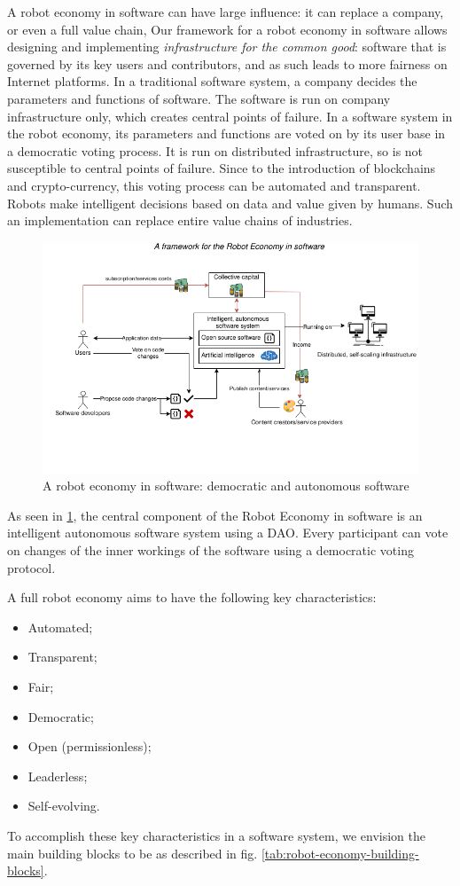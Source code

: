 A robot economy in software can have large influence: it can replace a company, or even a full value chain, Our framework for a robot economy in software allows designing and implementing \textit{infrastructure for the common good}: software that is governed by its key users and contributors, and as such leads to more fairness on Internet platforms. In a traditional software system, a company decides the parameters and functions of software. The software is run on company infrastructure only, which creates central points of failure. In a software system in the robot economy, its parameters and functions are voted on by its user base in a democratic voting process. It is run on distributed infrastructure, so is not susceptible to central points of failure. Since to the introduction of blockchains and crypto-currency, this voting process can be automated and transparent. Robots make intelligent decisions based on data and value given by humans. Such an implementation can replace entire value chains of industries.

\begin{figure}
    \centering
    \includegraphics[width=1\textwidth]{introduction/robot-economy-2.png}
    \caption{A robot economy in software: democratic and autonomous software}
    \label{fig:robot-economy-in-software}
\end{figure}

As seen in \ref{fig:robot-economy-in-software}, the central component of the Robot Economy in software is an intelligent autonomous software system using a DAO. Every participant can vote on changes of the inner workings of the software using a democratic voting protocol. 

A full robot economy aims to have the following key characteristics: 
\begin{itemize}
    \item Automated;
    \item Transparent;
    \item Fair;
    \item Democratic;
    \item Open (permissionless);
    \item Leaderless;
    \item Self-evolving.
\end{itemize}
To accomplish these key characteristics in a software system, we envision the main building blocks to be as described in fig. \ref{tab:robot-economy-building-blocks}.

